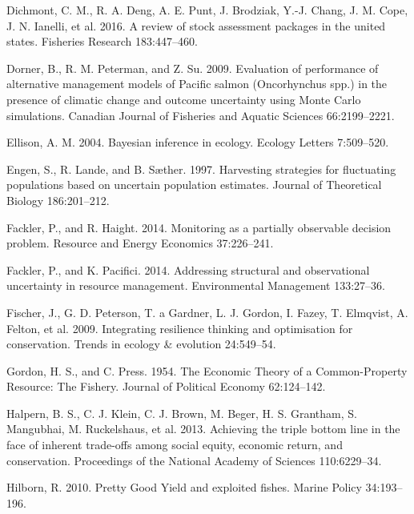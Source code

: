 \documentclass[3p]{elsarticle} %
\begin{document}
\leavevmode\hypertarget{ref-Dichmont2016}{}%
Dichmont, C. M., R. A. Deng, A. E. Punt, J. Brodziak, Y.-J. Chang, J. M.
Cope, J. N. Ianelli, et al. 2016. A review of stock assessment packages
in the united states. Fisheries Research 183:447--460.

\leavevmode\hypertarget{ref-Dorner2009}{}%
Dorner, B., R. M. Peterman, and Z. Su. 2009. Evaluation of performance
of alternative management models of Pacific salmon (Oncorhynchus spp.)
in the presence of climatic change and outcome uncertainty using Monte
Carlo simulations. Canadian Journal of Fisheries and Aquatic Sciences
66:2199--2221.

\leavevmode\hypertarget{ref-Ellison2004}{}%
Ellison, A. M. 2004. Bayesian inference in ecology. Ecology Letters
7:509--520.

\leavevmode\hypertarget{ref-Engen1997}{}%
Engen, S., R. Lande, and B. Sæther. 1997. Harvesting strategies for
fluctuating populations based on uncertain population estimates. Journal
of Theoretical Biology 186:201--212.

\leavevmode\hypertarget{ref-Fackler2014b}{}%
Fackler, P., and R. Haight. 2014. Monitoring as a partially observable
decision problem. Resource and Energy Economics 37:226--241.

\leavevmode\hypertarget{ref-Fackler2014}{}%
Fackler, P., and K. Pacifici. 2014. Addressing structural and
observational uncertainty in resource management. Environmental
Management 133:27--36.

\leavevmode\hypertarget{ref-Fischer2009}{}%
Fischer, J., G. D. Peterson, T. a Gardner, L. J. Gordon, I. Fazey, T.
Elmqvist, A. Felton, et al. 2009. Integrating resilience thinking and
optimisation for conservation. Trends in ecology \& evolution
24:549--54.

\leavevmode\hypertarget{ref-Gordon1954}{}%
Gordon, H. S., and C. Press. 1954. The Economic Theory of a
Common-Property Resource: The Fishery. Journal of Political Economy
62:124--142.

\leavevmode\hypertarget{ref-Halpern2013}{}%
Halpern, B. S., C. J. Klein, C. J. Brown, M. Beger, H. S. Grantham, S.
Mangubhai, M. Ruckelshaus, et al. 2013. Achieving the triple bottom line
in the face of inherent trade-offs among social equity, economic return,
and conservation. Proceedings of the National Academy of Sciences
110:6229--34.

\leavevmode\hypertarget{ref-Hilborn2010}{}%
Hilborn, R. 2010. Pretty Good Yield and exploited fishes. Marine Policy
34:193--196.
\end{document}
